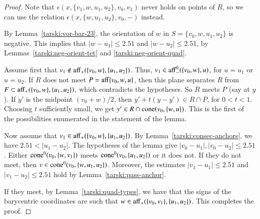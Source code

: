 \begin{proof}  
Note that $\epsilon(x,\{v_1,w,u_1,u_2\},v_0,v_1)$ never holds
on points of $R$, so we can use the relation
$\epsilon(x,\{w,u_1,u_2\},v_0,-)$ instead.

By Lemma~\ref{tarski:vor-bar-23}, the orientation
of $w$ in $S=\{v_0,w,u_1,u_2\}$ is negative.  This implies that
$|w-u_1|\le 2.51$ and  $|w-u_2|\le 2.51$, by
 Lemmas~\ref{tarski:neg-orient-tet} and \ref{tarski:neg-orient-quad}. 


Assume first that 
$v_1\not\in {\operatorname{aff}}_+(\{v_0,w\},\{u_1,u_2\})$.  
Thus, $v_1\in {\operatorname{aff}}_-^0(\{v_0,w\},u)$, for $u=u_1$ or $u=u_2$.
If $R$ does not meet $P={\operatorname{aff}}\{v_0,w,u\}$, then this plane separates
$R$ from $F\subset {\operatorname{aff}}_+(\{v_0,w\},\{u_1,u_2\})$, which contradicts
the hypotheses.  So $R$ meets $P$ (say at $y$).  
If $y'$ is the midpoint $(v_0+w)/2$, then
$y' + t (y - y')\in R\cap P$, for $0<t<1$.  Choosing $t$ sufficiently
small, we get $y'\in R\cap {\operatorname{cone}}(v_0,\{w,u\})$.
This is the first of the possibilities enumerated in the statement
of the lemma.

Now assume that
$v_1\in {\operatorname{aff}}_+(\{v_0,w\},\{u_1,u_2\})$.  
By Lemma~\ref{tarski:consec-anchors}, we have $2.51<|u_1-u_2|$.
The hypotheses of the lemma give $|v_0-u_1|,|v_0-u_2|\le 2.51$.
Either ${\operatorname{cone}}^0(v_0,\{w,v_1\})$ meets ${\operatorname{cone}}^0(v_0,\{u_1,u_2\})$
or it does not.  If they do not meet, then
$v\in{\operatorname{cone}}^0(v_0,\{w,u_1,u_2\})$.  Moreover, the
estimates $|v_1-u_1|\le 2.51$ and $|v_1-u_2|\le 2.51$ hold
by Lemma~\ref{tarski:pass-anchor}.  %

If they meet, by Lemma~\ref{tarski:quad-types}, we have that
the signs of the barycentric coordinates are such that
$w\in{\operatorname{aff}}_+(\{v_0,v_1\},\{u_1,u_2\})$.  This completes the proof.
\end{proof}


\newpage

